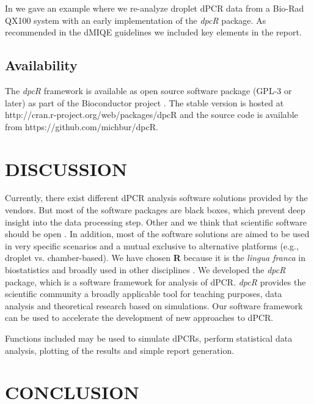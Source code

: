 \documentclass[a4,center,fleqn]{NAR}
\begin{document}
In \cite{rodiger_r_2015} we gave an example where we re-analyze droplet dPCR 
data from a Bio-Rad QX100 system with an early implementation of the 
\textit{dpcR} package. As recommended in the dMIQE guidelines 
\cite{huggett_digital_2013} we included key elements in the report.

\subsection{Availability}

The \textit{dpcR} framework is available as open source software package (GPL-3 
or later) as part of the Bioconductor project \cite{gentleman_2004}. The stable 
version is hosted at http://cran.r-project.org/web/packages/dpcR and the source 
code is available from  https://github.com/michbur/dpcR.

\section{DISCUSSION}

Currently, there exist different dPCR analysis software solutions provided by 
the vendors. But most of the software packages are black boxes, which prevent 
deep insight into the data processing step. Other and we think that scientific 
software should be open \cite{ince_case_2012, rodiger_r_2015}. In addition, most 
of the software solutions are aimed to be used in very specific scenarios and a 
mutual exclusive to alternative platforms (e.g., droplet vs. chamber-based). We 
have chosen \textbf{R} because it is the \textit{lingua franca} in biostatistics 
and broadly used in other disciplines \cite{rodiger_r_2015}. We developed the 
\textit{dpcR} package, which is a software framework for analysis of dPCR. 
\textit{dpcR} provides the scientific community a broadly applicable tool for 
teaching purposes, data analysis and theoretical research based on simulations. 
Our software framework can be used to accelerate the development of new 
approaches to dPCR.

Functions included may be used to simulate dPCRs, perform statistical data 
analysis, plotting of the results and simple report generation. 

\section{CONCLUSION}
\end{document}

